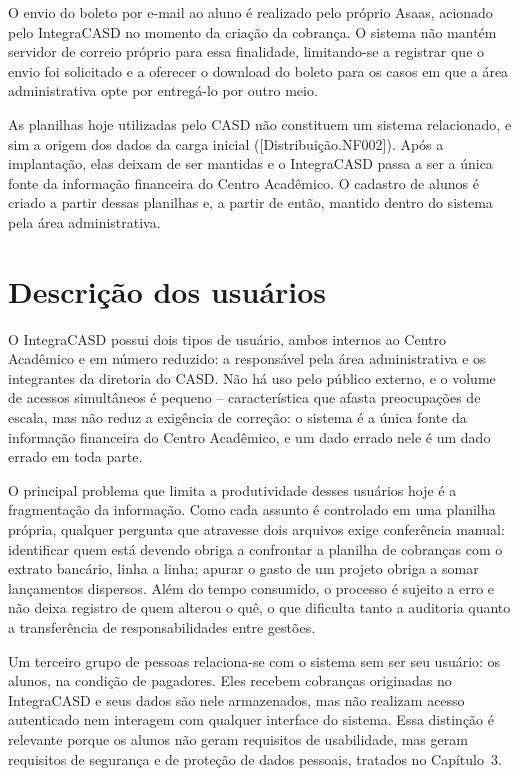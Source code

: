 \documentclass[11pt,a4paper,oneside]{report}
\begin{document}
O envio do boleto por e-mail ao aluno é realizado pelo próprio Asaas, acionado pelo IntegraCASD no
momento da criação da cobrança. O sistema não mantém servidor de correio próprio para essa
finalidade, limitando-se a registrar que o envio foi solicitado e a oferecer o download do boleto
para os casos em que a área administrativa opte por entregá-lo por outro meio.

As planilhas hoje utilizadas pelo CASD não constituem um sistema relacionado, e sim a origem dos
dados da carga inicial ([Distribuição.NF002]). Após a implantação, elas deixam de ser mantidas e o
IntegraCASD passa a ser a única fonte da informação financeira do Centro Acadêmico. O cadastro de
alunos é criado a partir dessas planilhas e, a partir de então, mantido dentro do sistema pela área
administrativa.

\section{Descrição dos usuários}

O IntegraCASD possui dois tipos de usuário, ambos internos ao Centro Acadêmico e em número
reduzido: a responsável pela área administrativa e os integrantes da diretoria do CASD. Não há uso
pelo público externo, e o volume de acessos simultâneos é pequeno -- característica que afasta
preocupações de escala, mas não reduz a exigência de correção: o sistema é a única fonte da
informação financeira do Centro Acadêmico, e um dado errado nele é um dado errado em toda parte.

O principal problema que limita a produtividade desses usuários hoje é a fragmentação da
informação. Como cada assunto é controlado em uma planilha própria, qualquer pergunta que atravesse
dois arquivos exige conferência manual: identificar quem está devendo obriga a confrontar a
planilha de cobranças com o extrato bancário, linha a linha; apurar o gasto de um projeto obriga a
somar lançamentos dispersos. Além do tempo consumido, o processo é sujeito a erro e não deixa
registro de quem alterou o quê, o que dificulta tanto a auditoria quanto a transferência de
responsabilidades entre gestões.

Um terceiro grupo de pessoas relaciona-se com o sistema sem ser seu usuário: os alunos, na condição
de pagadores. Eles recebem cobranças originadas no IntegraCASD e seus dados são nele armazenados,
mas não realizam acesso autenticado nem interagem com qualquer interface do sistema. Essa distinção
é relevante porque os alunos não geram requisitos de usabilidade, mas geram requisitos de segurança
e de proteção de dados pessoais, tratados no Capítulo~3.
\end{document}
